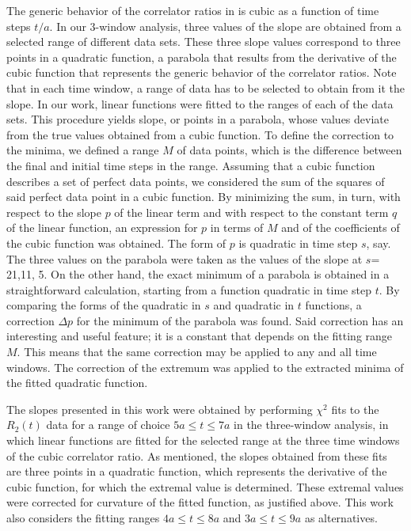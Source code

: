{The generic behavior of the correlator ratios in  is cubic as a function of time steps $t/a$.
In our 3-window analysis, three values of the slope are obtained from a selected range of different 
data sets. These three slope values correspond to three points in a quadratic function, a parabola that
results from the derivative of the cubic function that represents the generic behavior of the correlator
ratios. Note that in each time window, a range of data has to be selected to obtain from it the slope.
In our work, linear functions were fitted to the ranges of each of the data sets. This procedure yields
slope, or points in a parabola, whose values deviate from the true values obtained from a
cubic function. To define the correction to the minima, we defined a range $M$ of data points,
which is the difference between the final and initial time steps in the range. Assuming that a cubic
function describes a set of perfect data points, we considered the sum of the squares of said
perfect data point in a cubic function. By minimizing the sum, in turn, with respect to the slope
$p$ of the linear term and with respect to the constant term $q$ of the linear function, an expression
for $p$ in terms of $M$ and of the coefficients of the cubic function was obtained. The form of
$p$ is quadratic in time step $s$, say. The three values on the parabola
were taken as the values of the slope at $s$= 21,11, 5. On the other hand, the exact minimum
of a parabola is obtained in a straightforward calculation, starting from a function quadratic in time 
step $t$. By comparing the forms of the quadratic in $s$ and quadratic in $t$ functions, a correction
$\Delta p$ for the minimum of the parabola was found. Said correction has an interesting and useful
feature; it is a constant that depends on the fitting range $M$. This means that the same correction 
may be applied to any and all time windows. The correction of the extremum was applied 
to the extracted minima of the fitted quadratic function.

The slopes presented in this work were obtained by performing $\chi^2$ 
fits to the $R_2(t)$ data for a range of choice $5a\le t\le7a$ in the three-window analysis,
in which linear functions are fitted for the selected range at the three time windows
of the cubic correlator ratio. As mentioned, the slopes obtained from these fits are three points in
a quadratic function, which represents the derivative of the cubic function, for which the
extremal value is determined. These extremal values were corrected for curvature of the
fitted function, as justified above. This work also considers the fitting ranges $4a\le t\le 8a$ and $3a\le t\le 9a$ 
as alternatives. 
}
